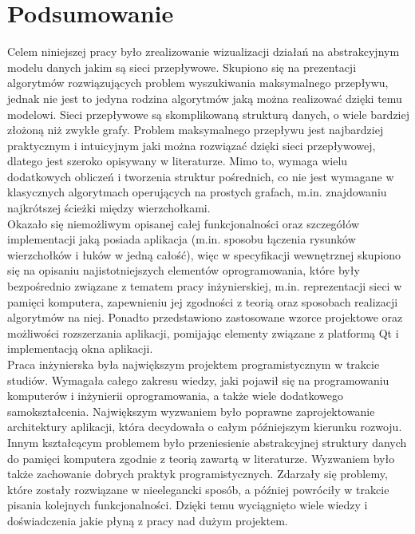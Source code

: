 \chapter{Podsumowanie}
Celem niniejszej pracy było zrealizowanie wizualizacji działań na abstrakcyjnym modelu danych jakim są sieci przepływowe. Skupiono się na prezentacji algorytmów rozwiązujących problem wyszukiwania maksymalnego przepływu, jednak nie jest to jedyna rodzina algorytmów jaką można realizować dzięki temu modelowi. Sieci przepływowe są skomplikowaną strukturą danych, o wiele bardziej złożoną niż zwykłe grafy. Problem maksymalnego przepływu jest najbardziej praktycznym i intuicyjnym jaki można rozwiązać dzięki sieci przepływowej, dlatego jest szeroko opisywany w literaturze. Mimo to, wymaga wielu dodatkowych obliczeń i tworzenia struktur pośrednich, co nie jest wymagane w klasycznych algorytmach operujących na prostych grafach, m.in. znajdowaniu najkrótszej ścieżki między wierzchołkami.\\\indent
Okazało się niemożliwym opisanej całej funkcjonalności oraz szczegółów implementacji jaką posiada aplikacja (m.in. sposobu łączenia rysunków wierzchołków i łuków w jedną całość), więc w specyfikacji wewnętrznej skupiono się na opisaniu najistotniejszych elementów oprogramowania, które były bezpośrednio związane z tematem pracy inżynierskiej, m.in. reprezentacji sieci w pamięci komputera, zapewnieniu jej zgodności z teorią oraz sposobach realizacji algorytmów na niej. Ponadto przedstawiono zastosowane wzorce projektowe oraz możliwości rozszerzania aplikacji, pomijając elementy związane z platformą Qt i implementacją okna aplikacji.\\\indent
Praca inżynierska była największym projektem programistycznym w trakcie studiów. Wymagała całego zakresu wiedzy, jaki pojawił się na programowaniu komputerów i inżynierii oprogramowania, a także wiele dodatkowego samokształcenia. Największym wyzwaniem było poprawne zaprojektowanie architektury aplikacji, która decydowała o całym późniejszym kierunku rozwoju. Innym kształcącym problemem było przeniesienie abstrakcyjnej struktury danych do pamięci komputera zgodnie z teorią zawartą w literaturze. Wyzwaniem było także zachowanie dobrych praktyk programistycznych. Zdarzały się problemy, które zostały rozwiązane w nieelegancki sposób, a później powróciły w trakcie pisania kolejnych funkcjonalności. Dzięki temu wyciągnięto wiele wiedzy i doświadczenia jakie płyną z pracy nad dużym projektem.\\\indent
